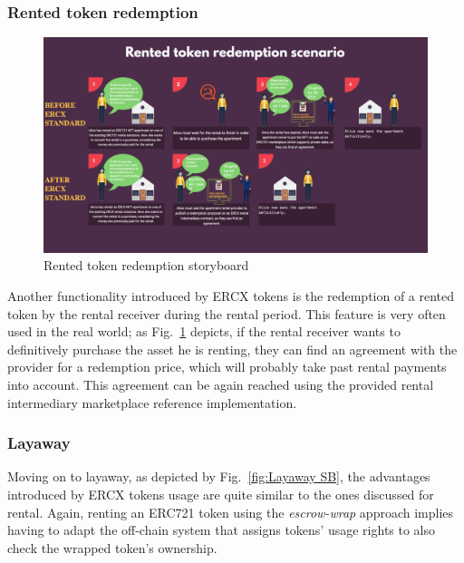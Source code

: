 \documentclass[english, LaM, oneside]{sapthesis}%
\begin{document}
\subsubsection{Rented token redemption}
\begin{figure}[H]
    \centering
        \begin{adjustbox}{width=1\textwidth}
            \includegraphics{storyboards/rentedTokenRedemption.pdf}
        \end{adjustbox}
    \caption{Rented token redemption storyboard}
    \label{fig:RentedTokenRedemption SB}
\end{figure}

Another functionality introduced by ERCX tokens is the redemption of a rented token by the rental receiver during the rental period. 
This feature is very often used in the real world; as Fig.~\ref{fig:RentedTokenRedemption SB} depicts, if the rental receiver wants to definitively purchase the asset he is renting, they can find an agreement with the provider for a redemption price, which will probably take past rental payments into account.
This agreement can be again reached using the provided rental intermediary marketplace reference implementation.


\subsubsection{Layaway}

Moving on to layaway, as depicted by Fig.~\ref{fig:Layaway SB}, the advantages introduced by ERCX tokens usage are quite similar to the ones discussed for rental. Again, renting an ERC721 token using the \textit{escrow-wrap} approach implies having to adapt the off-chain system that assigns tokens' usage rights to also check the wrapped token's ownership.
\end{document}
